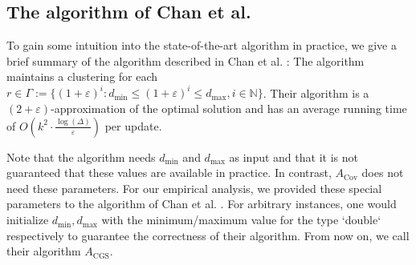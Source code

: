 
\subsection{The algorithm of Chan et al. \cite{hubert2018dynamic}}
To gain some intuition into the state-of-the-art algorithm in practice, we give a brief summary of the algorithm described in Chan et al. \cite{hubert2018dynamic}: The algorithm maintains a clustering for each $r \in \Gamma := \{(1 + \varepsilon)^i : d_{\text{min}} \leq (1 + \varepsilon)^i \leq d_{\text{max}}, i \in \mathbb{N}\}$. Their algorithm is a $(2 + \varepsilon)$-approximation of the optimal solution and has an average running time of $O(k^2 \cdot \frac{\log(\Delta)}{\varepsilon})$ per update. 

Note that the algorithm needs $d_{\text{min}}$ and $d_{\text{max}}$ as input and that it is not guaranteed that these values are available in practice. In contrast, $A_{\text{Cov}}$ does not need these parameters. For our empirical analysis, we provided these special parameters to the algorithm of Chan et al. \cite{hubert2018dynamic}. For arbitrary instances, one would initialize $d_{\text{min}}, d_{\text{max}}$ with the minimum/maximum value for the type `double` respectively to guarantee the correctness of their algorithm. From now on, we call their algorithm $A_{\text{CGS}}$.